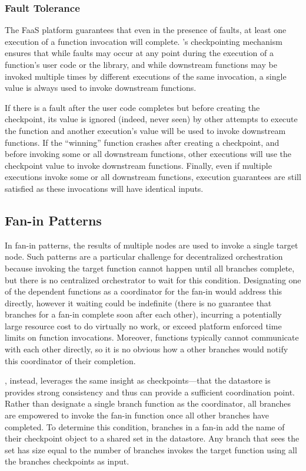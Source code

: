\subsubsection{Fault Tolerance}

The FaaS platform guarantees that even in the presence of faults, at least one
execution of a function invocation will complete. \name{}'s checkpointing
mechanism ensures that while faults may occur at any point during the execution of a
function's user code or the \name{} library, and while downstream functions may
be invoked multiple times by different executions of the same invocation, a
single value is always used to invoke downstream functions.

If there is a fault after the user code completes but before creating the
checkpoint, its value is ignored (indeed, never seen) by other attempts to
execute the function and another execution's value will be used to invoke
downstream functions.  If the ``winning'' function crashes after creating a
checkpoint, and before invoking some or all downstream functions, other
executions will use the checkpoint value to invoke downstream functions.
Finally, even if multiple executions invoke some or all downstream functions,
execution guarantees are still satisfied as these invocations will have
identical inputs.

\subsection{Fan-in Patterns}\label{sec:design:fanin}

In fan-in patterns, the results of multiple nodes are used to invoke a single
target node. Such patterns are a particular challenge for decentralized
orchestration because invoking the target function cannot happen until all
branches complete, but there is no centralized orchestrator to wait for this
condition. Designating one of the dependent functions as a coordinator for the
fan-in would address this directly, however it waiting could be indefinite
(there is no guarantee that branches for a fan-in complete soon after each
other), incurring a potentially large resource cost to do virtually no work, or
exceed platform enforced time limits on function invocations. Moreover,
functions typically cannot communicate with each other directly, so it is no
obvious how a other branches would notify this coordinator of their completion.

\name{}, instead, leverages the same insight as checkpoints---that the datastore
is provides strong consistency and thus can provide a sufficient coordination
point. Rather than designate a single branch function as the coordinator, all
branches are empowered to invoke the fan-in function once all other branches
have completed. To determine this condition, branches in a fan-in add the name
of their checkpoint object to a shared set in the datastore. Any branch that
sees the set has size equal to the number of branches invokes the target
function using all the branches checkpoints as input.


